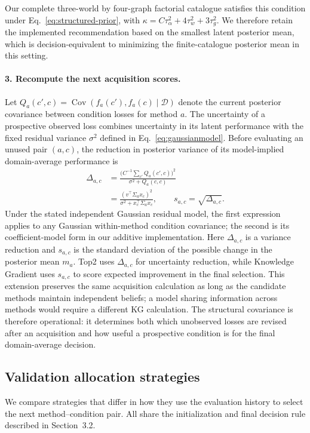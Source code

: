\documentclass[10pt,a4paper]{article}
\newif\ifrevisionmarked
\newcommand{\revadd}[1]{\ifrevisionmarked\hl{#1}\else#1\fi}
\newcommand{\revaddmath}[1]{\ifrevisionmarked\colorbox{yellow}{$#1$}\else#1\fi}
\begin{document}
\revadd{Our complete three-world by four-graph factorial catalogue satisfies this condition under Eq.}~\eqref{eq:structured-prior}, \revadd{with}
$\revaddmath{\kappa=C\tau_\alpha^2+4\tau_w^2+3\tau_g^2}$.
\revadd{We therefore retain the implemented recommendation based on the smallest latent posterior mean, which is decision-equivalent to minimizing the finite-catalogue posterior mean in this setting.}

\paragraph{3. Recompute the next acquisition scores.}
Let $Q_a(c',c)=\operatorname{Cov}(f_a(c'),f_a(c)\mid\mathcal D)$ denote the current posterior covariance between condition losses for method $a$. The uncertainty of a prospective observed loss combines uncertainty in its latent performance with the fixed residual variance $\sigma^2$ defined in Eq.~\eqref{eq:gaussianmodel}. Before evaluating an unused pair $(a,c)$, the reduction in posterior variance of its model-implied domain-average performance is
\begin{equation}
\begin{aligned}
\Delta_{a,c}
&=\frac{\bigl(C^{-1}\sum_{c'}Q_a(c',c)\bigr)^2}
{\sigma^2+Q_a(c,c)}\\
&=\frac{(v^\top\Sigma_a x_c)^2}
{\sigma^2+x_c^\top\Sigma_a x_c},
\qquad s_{a,c}=\sqrt{\Delta_{a,c}}.
\end{aligned}
\label{eq:gain}
\end{equation}
Under the stated independent Gaussian residual model, the first expression applies to any Gaussian within-method condition covariance; the second is its coefficient-model form in our additive implementation. Here $\Delta_{a,c}$ is a variance reduction and $s_{a,c}$ is the standard deviation of the possible change in the posterior mean $m_a$. Top2 uses $\Delta_{a,c}$ for uncertainty reduction, while Knowledge Gradient uses $s_{a,c}$ to score expected improvement in the final selection. This extension preserves the same acquisition calculation as long as the candidate methods maintain independent beliefs; a model sharing information across methods would require a different KG calculation. The structural covariance is therefore operational: it determines both which unobserved losses are revised after an acquisition and how useful a prospective condition is for the final domain-average decision.

\subsection{Validation allocation strategies}
We compare strategies that differ in how they use the evaluation history to select the next method--condition pair. All share the initialization and final decision rule described in Section~3.2.
\end{document}
